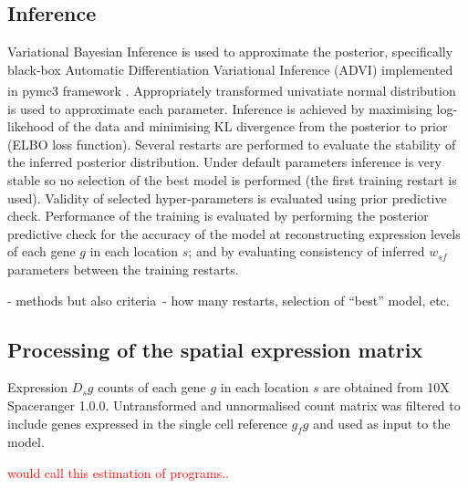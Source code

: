 \documentclass[11pt,a4paper]{article}
\newcommand{\red}{\textcolor{red}}
\begin{document}
\subsection{Inference} \label{c2l_inference}

Variational Bayesian Inference is used to approximate the posterior, specifically black-box Automatic Differentiation Variational Inference (ADVI) implemented in pymc3 framework \textsuperscript{\cite{salvatier_probabilistic_2016}}. Appropriately transformed univatiate normal distribution is used to approximate each parameter. Inference is achieved by maximising log-likehood of the data and minimising KL divergence from the posterior to prior (ELBO loss function).
Several restarts are performed to evaluate the stability of the inferred posterior distribution. Under default parameters inference is very stable so no selection of the best model is performed (the first training restart is used). Validity of selected hyper-parameters is evaluated using prior predictive check. Performance of the training is evaluated by performing the posterior predictive check for the accuracy of the model at reconstructing expression levels of each gene $g$ in each location $s$; and by evaluating consistency of inferred $w_{sf}$ parameters between the training restarts.

- methods but also criteria\
- how many restarts, selection of “best” model, etc. 

\subsection{Processing of the spatial expression matrix} \label{c2l_sp_proc}
Expression $D_sg$ counts of each gene $g$ in each location $s$ are obtained from 10X Spaceranger 1.0.0. Untransformed and unnormalised count matrix was filtered to include genes expressed in the single cell reference $g_fg$ and used as input to the model.

\red{would call this estimation of programs..}
\end{document}
